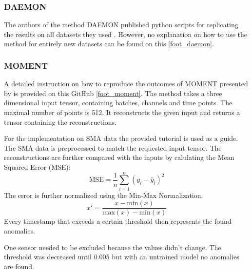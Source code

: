 \subsubsection{DAEMON}
The authors of the method DAEMON published python scripts for replicating the results on all datasets they used \cite{chen_adversarial_2023}. However, no explanation on how to use the method for entirely new datasets can be found on this \autoref{foot_daemon}.

\subsubsection{MOMENT}
A detailed instruction on how to reproduce the outcomes of MOMENT presented by \cite{goswami_moment_2024} is provided on this GitHub \autoref{foot_moment}. The method takes a three dimensional input tensor, containing batches, channels and time points. The maximal number of points is 512. It reconstructs the given input and returns a tensor containing the reconstructions.

For the implementation on SMA data the provided tutorial is used as a guide. The SMA data is preprocessed to match the requested input tensor. The reconstructions are further compared with the inputs by calulating the Mean Squared Error (MSE):
\begin{equation}
    \text{MSE} = \frac{1}{n} \sum_{i=1}^{n} \left( y_i - \hat{y}_i \right)^2
\end{equation}
The error is further normalized using the Min-Max Normalization:
\begin{equation}
x' = \frac{x - \text{min}(x)}{\text{max}(x) - \text{min}(x)}
\end{equation}
Every timestamp that exceeds a certain threshold then represents the found anomalies.

One sensor needed to be excluded because the values didn't change. The threshold was decreased until 0.005 but with an untrained model no anomalies are found.
